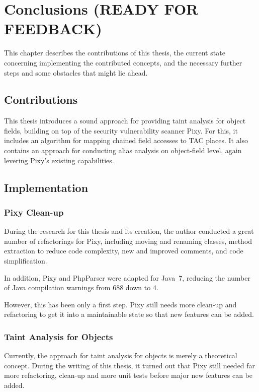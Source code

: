 \chapter{Conclusions (READY FOR FEEDBACK)}
\label{conclusions}

This chapter describes the contributions of this thesis, the current state concerning implementing the contributed concepts, and the necessary further steps and some obstacles that might lie ahead.

\section{Contributions}

This thesis introduces a sound approach for providing taint analysis for object fields, building on top of the security vulnerability scanner Pixy. For this, it includes an algorithm for mapping chained field accesses to TAC places. It also contains an approach for conducting alias analysis on object-field level, again levering Pixy's existing capabilities.


\section{Implementation}

\subsection{Pixy Clean-up}

During the research for this thesis and its creation, the author conducted a great number of refactorings for Pixy, including moving and renaming classes, method extraction to reduce code complexity, new and improved comments, and code simplification.

In addition, Pixy and PhpParser were adapted for Java~7, reducing the number of Java compilation warnings from 688 down to 4.

However, this has been only a first step. Pixy still needs more clean-up and refactoring to get it into a maintainable state so that new features can be added.


\subsection{Taint Analysis for Objects}

Currently, the approach for taint analysis for objects is merely a theoretical concept. During the writing of this thesis, it turned out that Pixy still needed far more refactoring, clean-up and more unit tests before major new features can be added.


